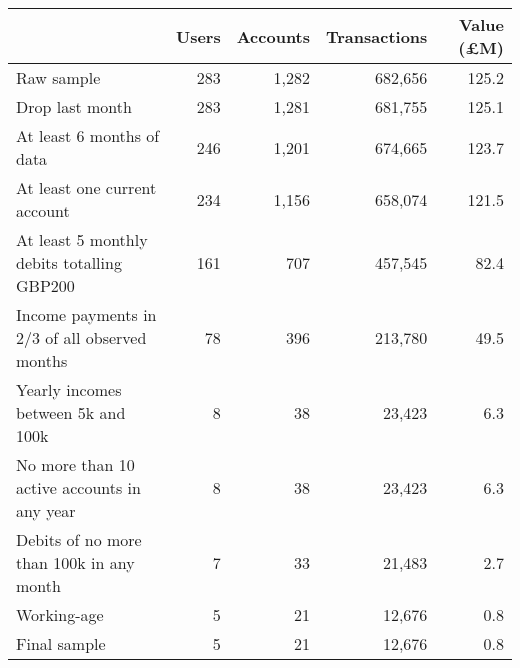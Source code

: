 \begin{tabular}{lrrrr}
\toprule
                                              & Users & Accounts & Transactions & Value (\pounds M) \\
\midrule
                                   Raw sample &   283 &    1,282 &      682,656 &             125.2 \\
                              Drop last month &   283 &    1,281 &      681,755 &             125.1 \\
                    At least 6 months of data &   246 &    1,201 &      674,665 &             123.7 \\
                 At least one current account &   234 &    1,156 &      658,074 &             121.5 \\
   At least 5 monthly debits totalling GBP200 &   161 &      707 &      457,545 &              82.4 \\
Income payments in 2/3 of all observed months &    78 &      396 &      213,780 &              49.5 \\
           Yearly incomes between 5k and 100k &     8 &       38 &       23,423 &               6.3 \\
  No more than 10 active accounts in any year &     8 &       38 &       23,423 &               6.3 \\
     Debits of no more than 100k in any month &     7 &       33 &       21,483 &               2.7 \\
                                  Working-age &     5 &       21 &       12,676 &               0.8 \\
                                 Final sample &     5 &       21 &       12,676 &               0.8 \\
\bottomrule
\end{tabular}
